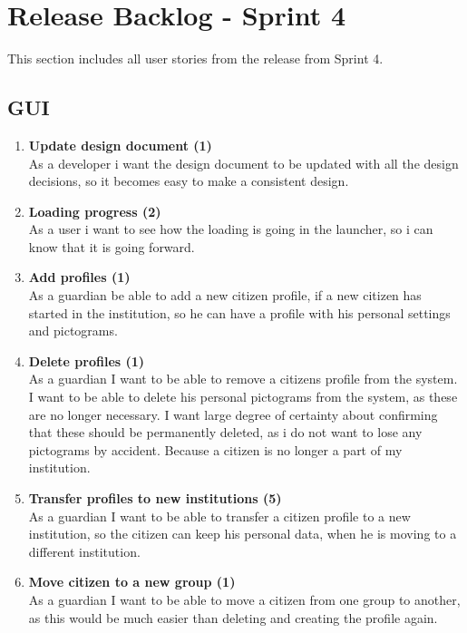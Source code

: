 \section{Release Backlog - Sprint 4}
This section includes all user stories from the release from Sprint 4.

\subsection{GUI}

\begin{enumerate}
	\setcounter{enumi}{0} %
	\item \textbf{Update design document (1)}\\
	As a developer i want the design document to be updated with all the design decisions, so it becomes easy to make a consistent design.
	
	\item \textbf{Loading progress (2)}\\
	As a user i want to see how the loading is going in the launcher, so i can know that it is going forward.
	
	\item \textbf{Add profiles (1)}\\
	As a guardian be able to add a new citizen profile, if a new citizen has started in the institution, so he can have a profile with his personal settings and pictograms. 
	
	\item \textbf{Delete profiles (1)}\\
	As a guardian I want to be able to remove a citizens profile from the system. I want to be able to delete his personal pictograms from the system, as these are no longer necessary. I want large degree of certainty about confirming that these should be permanently deleted, as i do not want to lose any pictograms by accident. Because a citizen is no longer a part of my institution.
	
	\item \textbf{Transfer profiles to new institutions (5)}\\
	As a guardian I want to be able to transfer a citizen profile to a new institution, so the citizen can keep his personal data, when he is moving to a different institution. 
	
	\item \textbf{Move citizen to a new group (1)}\\
	As a guardian I want to be able to move a citizen from one group to another, as this would be much easier than deleting and creating the profile again.
	

\end{enumerate}
